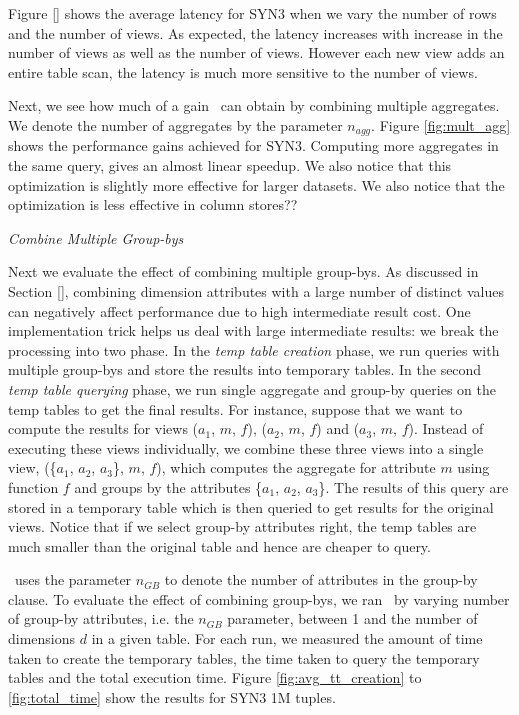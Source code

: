  Figure \ref{} shows the average latency for SYN3 when we vary the number of
 rows and the number of views.
 As expected, the latency increases with increase in the number of views as well
 as the number of views.
 However each new view adds an entire table scan, the latency is much more
 sensitive to the number of views.
 
Next, we see how much of a gain \VizRecDB\ can obtain by combining multiple
aggregates. We denote the number of aggregates by the parameter $n_{agg}$.
Figure \ref{fig:mult_agg} shows the performance gains achieved for SYN3. 
Computing more aggregates in the same query, gives an almost linear speedup. 
We also notice that this optimization is slightly more effective for larger
datasets.
We also notice that the optimization is less effective in column stores??

{\it Combine Multiple Group-bys}
\label{sec:mult_gb_expt}

Next we evaluate the effect of combining multiple group-bys.
As discussed in Section \ref{}, combining dimension attributes with a large
number of distinct values can negatively affect performance due to high
intermediate result cost.
One implementation trick helps us deal with large intermediate results: we break
the processing into two phase. 
In the {\it temp table creation} phase, we run queries with multiple group-bys
and store the results into temporary tables.
In the second {\it temp table querying} phase, we run single aggregate and
group-by queries on the temp tables to get the final results.
For instance, suppose that we want to compute the results for views ($a_1$, $m$,
$f$), ($a_2$, $m$, $f$) and ($a_3$, $m$, $f$). Instead of executing these views
individually, we combine these three views into a single view, (\{$a_1$, $a_2$,
$a_3$\}, $m$, $f$), which computes the aggregate for attribute $m$ using
function $f$ and groups by the attributes \{$a_1$, $a_2$, $a_3$\}. The results
of this query are stored in a temporary table which is then queried to get
results for the original views. 
Notice that if we select group-by attributes right, the temp tables are much
smaller than the original table and hence are cheaper to query.

\VizRecDB\ uses the parameter $n_{GB}$ to denote the number of attributes in the
group-by clause. To evaluate the effect of combining group-bys, we ran \VizRecDB\
by varying number of group-by attributes, i.e. the $n_{GB}$ parameter, between 1
and the number of dimensions $d$ in a given table. For each run, we measured the
amount of time taken to create the temporary tables, the time taken to query the
temporary tables and the total execution time. Figure
\ref{fig:avg_tt_creation} to \ref{fig:total_time} show the
results for SYN3 1M tuples.

